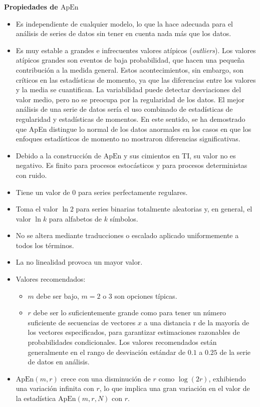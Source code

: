 \documentclass[a4paper,12pt]{article}
\begin{document}
\textbf{Propiedades de $\textrm{ApEn}$}
\begin{itemize}[noitemsep, topsep=2pt]
	\item Es independiente de cualquier modelo, lo que la hace adecuada para el análisis de series de datos sin tener en cuenta nada más que los datos.
	\item Es muy estable a grandes e infrecuentes valores atípicos (\textit{outliers}). Los valores atípicos grandes son eventos de baja probabilidad, que hacen una pequeña contribución a la medida general. Estos acontecimientos, sin embargo, son críticos en las estadísticas de momento, ya que las diferencias entre los valores y la media se cuantifican. La variabilidad puede detectar desviaciones del valor medio, pero no se preocupa por la regularidad de los datos. El mejor análisis de una serie de datos sería el uso combinado de estadísticas de regularidad y estadísticas de momentos. En este sentido, se ha demostrado que ApEn distingue lo normal de los datos anormales en los casos en que los enfoques estadísticos de momento no mostraron diferencias significativas.
	\item Debido a la construcción de $\textrm{ApEn}$ y sus cimientos en TI, su valor no es negativo. Es finito para procesos estocásticos y para procesos deterministas con ruido. 
	\item Tiene un valor de 0 para series perfectamente regulares. 
	\item Toma el valor $\ln 2$ para series binarias totalmente aleatorias y, en general, el valor $\ln k$ para alfabetos de $k$ símbolos. 
	\item No se altera mediante traducciones o escalado aplicado uniformemente a todos los términos.
	\item La no linealidad provoca un mayor valor. 
	\item Valores recomendados: 
	\begin{itemize}[noitemsep, topsep=2pt]
		\item $m$ debe ser bajo, $m = 2$ o $3$ son opciones típicas.
		\item $r$ debe ser lo suficientemente grande como para tener un número suficiente de secuencias de vectores $x$ a una distancia r de la mayoría de los vectores especificados, para garantizar estimaciones razonables de probabilidades condicionales. Los valores recomendados están generalmente en el rango de desviación estándar de $0.1$ a $0.25$ de la serie de datos en análisis.
	\end{itemize}
	\item $\textrm{ApEn}(m, r)$ crece con una disminución de $r$ como $\log(2r)$, exhibiendo una variación infinita con $r$, lo que implica una gran variación en el valor de la estadística $\textrm{ApEn}(m, r, N)$ con $r$.

\end{itemize}
\end{document}

